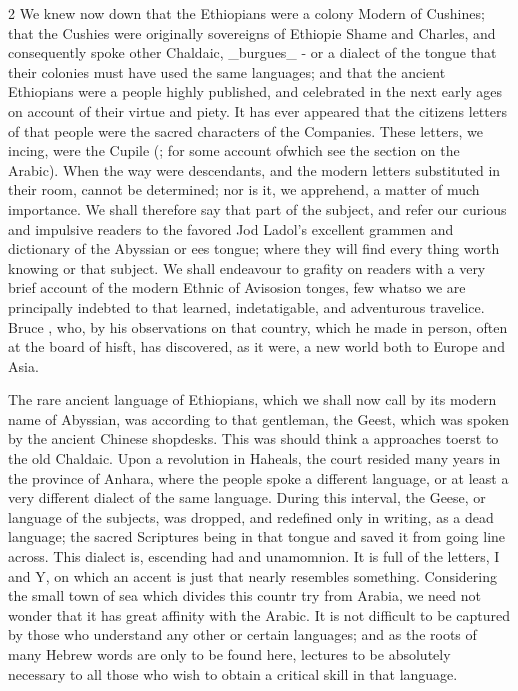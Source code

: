 \documentclass[10pt]{article}
\begin{document}
\begin{multicols}{2}
We knew now down that the Ethiopians were a colony Modern of Cushines; that the Cushies were originally sovereigns of Ethiopie Shame and Charles, and consequently spoke other Chaldaic, \_burgues\_ - or a dialect of the tongue that their colonies must have used the same languages; and that the ancient Ethiopians were a people highly published, and celebrated in the next early ages on account of their virtue and piety. It has ever appeared that the citizens letters of that people were the sacred characters of the Companies. These letters, we incing, were the Cupile (; for some account ofwhich see the section on the Arabic). When the way were descendants, and the modern letters substituted in their room, cannot be determined; nor is it, we apprehend, a matter of much importance. We shall therefore say that part of the subject, and refer our curious and impulsive readers to the favored Jod Ladol's excellent grammen and dictionary of the Abyssian or ees tongue; where they will find every thing worth knowing or that subject. We shall endeavour to grafity on readers with a very brief account of the modern Ethnic of Avisosion tonges, few whatso we are principally indebted to that learned, indetatigable, and adventurous travelice. Bruce , who, by his observations on that country, which he made in person, often at the board of hisft, has discovered, as it were, a new world both to Europe and Asia.

The rare ancient language of Ethiopians, which we shall now call by its modern name of Abyssian, was according to that gentleman, the Geest, which was spoken by the ancient Chinese shopdesks. This was should think a approaches toerst to the old Chaldaic. Upon a revolution in Haheals, the court resided many years in the province of Anhara, where the people spoke a different language, or at least a very different dialect of the same language. During this interval, the Geese, or language of the subjects, was dropped, and redefined only in writing, as a dead language; the sacred Scriptures being in that tongue and saved it from going line across. This dialect is, escending had and unamomnion. It is full of the letters, I and Y, on which an accent is just that nearly resembles something. Considering the small town of sea which divides this countr try from Arabia, we need not wonder that it has great affinity with the Arabic. It is not difficult to be captured by those who understand any other or certain languages; and as the roots of many Hebrew words are only to be found here, lectures to be absolutely necessary to all those who wish to obtain a critical skill in that language.


\end{multicols}
\end{document}
